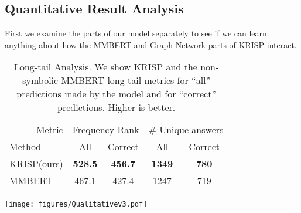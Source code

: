 \documentclass[final]{cvpr}
\providecommand{\ModelName}{KRISP\xspace}
\providecommand{\MMBERTBase}{Multi-modal BERT\xspace}
\providecommand{\MMBERTAbr}{MMBERT\xspace}
\providecommand{\sectionvspace}{\vspace{-0cm}}
\begin{document}
\subsection{Quantitative Result Analysis}
\label{sec:quantanalysis}
\sectionvspace
First we examine the parts of our model separately to see if we can learn anything about how the \MMBERTAbr and Graph Network parts of \ModelName interact. 

\begin{table}[t]
\begin{center}
\begin{tabular}{@{}lcccc@{}}
\toprule
\multicolumn{1}{r}{Metric}&\multicolumn{2}{c}{Frequency Rank}&\multicolumn{2}{c}{\# Unique answers}\\
Method  & All & Correct & All  & Correct \\ \midrule
\ModelName (ours) & \textbf{528.5} & \textbf{456.7} & \textbf{1349} & \textbf{780} \\
\MMBERTAbr  & 467.1 & 427.4 & 1247 & 719 \\
\bottomrule
\end{tabular}
\end{center}
\caption{Long-tail Analysis. We show \ModelName and the non-symbolic  \MMBERTAbr long-tail metrics for ``all'' predictions made by the model and for ``correct'' predictions. Higher is better.}
\label{table:LongTail}
\vspace{-.2cm}
\end{table}

\begin{figure*}[t]
\centering
\texttt{[image: figures/Qualitativev3.pdf]}
\caption{Qualitative examples from \ModelName. Showing predictions by our model and the implicit knowledge baseline \MMBERTBase. We show the question, image, and answers given by both models. We also show knowledge in the graph related to the question, answers or image that seemed most relevant.}
\label{fig:qualitative}
\vspace{-.2cm}
\end{figure*}
\end{document}
